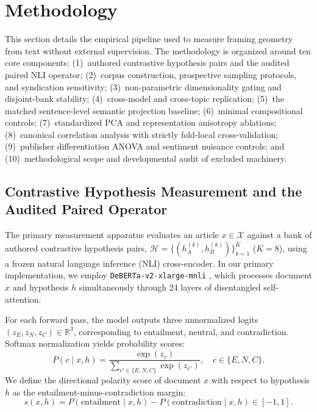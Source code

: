 \section{Methodology}

This section details the empirical pipeline used to measure framing geometry from text without external supervision. The methodology is organized around ten core components: (1)~authored contrastive hypothesis pairs and the audited paired NLI operator; (2)~corpus construction, prospective sampling protocols, and syndication sensitivity; (3)~non-parametric dimensionality gating and disjoint-bank stability; (4)~cross-model and cross-topic replication; (5)~the matched sentence-level semantic projection baseline; (6)~minimal compositional controls; (7)~standardized PCA and representation anisotropy ablations; (8)~canonical correlation analysis with strictly fold-local cross-validation; (9)~publisher differentiation ANOVA and sentiment nuisance controls; and (10)~methodological scope and developmental audit of excluded machinery.

\subsection{Contrastive Hypothesis Measurement and the Audited Paired Operator}
\label{sec:meth_paired_operator}

The primary measurement apparatus evaluates an article $x \in \mathcal{X}$ against a bank of authored contrastive hypothesis pairs, $\mathcal{H} = \{(h_A^{(k)}, h_B^{(k)})\}_{k=1}^K$ ($K=8$), using a frozen natural language inference (NLI) cross-encoder. In our primary implementation, we employ \texttt{DeBERTa-v2-xlarge-mnli} \citep{he2021deberta}, which processes document $x$ and hypothesis $h$ simultaneously through 24 layers of disentangled self-attention.

For each forward pass, the model outputs three unnormalized logits $(z_E, z_N, z_C) \in \mathbb{R}^3$, corresponding to entailment, neutral, and contradiction. Softmax normalization yields probability scores:
\begin{equation}
    P(c \mid x, h) = \frac{\exp(z_c)}{\sum_{c' \in \{E, N, C\}} \exp(z_{c'})}, \quad c \in \{E, N, C\}.
\end{equation}
We define the directional polarity score of document $x$ with respect to hypothesis $h$ as the entailment-minus-contradiction margin:
\begin{equation}
    s(x, h) = P(\text{entailment} \mid x, h) - P(\text{contradiction} \mid x, h) \in [-1, 1].
\end{equation}

